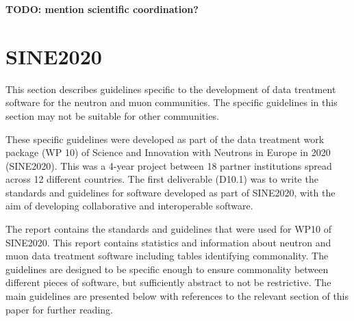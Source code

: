 \documentclass[jnr]{iosart2x}
\newcommand{\todo}[1]{\textbf{#1}}
\begin{document}
\todo{TODO: mention scientific coordination?}

\section{SINE2020}
\label{SINE2020}

This section describes guidelines specific to the development of data treatment software for the neutron and muon communities.
The specific guidelines in this section may not be suitable for other communities.

These specific guidelines were developed as part of the data treatment work package (WP 10) of Science and Innovation with Neutrons in Europe in 2020 (SINE2020).
This was a 4-year project between 18 partner institutions spread across 12 different countries.
The first deliverable (D10.1) was to write the standards and guidelines for software developed as part of SINE2020, with the aim of developing collaborative and interoperable software.

The report \cite{sine2020_wp10_d10_report} contains the standards and guidelines that were used for WP10 of SINE2020.
This report contains statistics and information about neutron and muon data treatment software including tables identifying commonality.
The guidelines are designed to be specific enough to ensure commonality between different pieces of software, but sufficiently abstract to not be restrictive.
The main guidelines are presented below with references to the relevant section of this paper for further reading.
\end{document}

